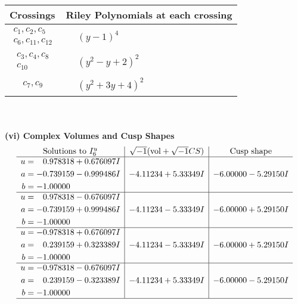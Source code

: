 \documentclass[1p]{elsarticle_modified}
\theoremstyle{definition}
\newcommand{\I}{\sqrt{-1}}
\begin{document}
\begin{tabular}{m{50pt}|m{274pt}}
Crossings & \hspace{64pt}Riley Polynomials at each crossing \\
\hline $$\begin{aligned}c_{1},c_{2},c_{5}\\c_{6},c_{11},c_{12}\end{aligned}$$&$\begin{aligned}
&(y-1)^4
\end{aligned}$\\
\hline $$\begin{aligned}c_{3},c_{4},c_{8}\\c_{10}\end{aligned}$$&$\begin{aligned}
&(y^2- y+2)^2
\end{aligned}$\\
\hline $$\begin{aligned}c_{7},c_{9}\end{aligned}$$&$\begin{aligned}
&(y^2+3 y+4)^2
\end{aligned}$\\
\hline
\end{tabular}\\~\\
\newpage\flushleft \textbf{(vi) Complex Volumes and Cusp Shapes}
$$\begin{array}{c|c|c}  
\text{Solutions to }I^u_{6}& \I (\text{vol} + \sqrt{-1}CS) & \text{Cusp shape}\\
 \hline 
\begin{aligned}
u &= \phantom{-}0.978318 + 0.676097 I \\
a &= -0.739159 - 0.999486 I \\
b &= -1.00000\phantom{ +0.000000I}\end{aligned}
 & -4.11234 + 5.33349 I & -6.00000 - 5.29150 I \\ \hline\begin{aligned}
u &= \phantom{-}0.978318 - 0.676097 I \\
a &= -0.739159 + 0.999486 I \\
b &= -1.00000\phantom{ +0.000000I}\end{aligned}
 & -4.11234 - 5.33349 I & -6.00000 + 5.29150 I \\ \hline\begin{aligned}
u &= -0.978318 + 0.676097 I \\
a &= \phantom{-}0.239159 + 0.323389 I \\
b &= -1.00000\phantom{ +0.000000I}\end{aligned}
 & -4.11234 - 5.33349 I & -6.00000 + 5.29150 I \\ \hline\begin{aligned}
u &= -0.978318 - 0.676097 I \\
a &= \phantom{-}0.239159 - 0.323389 I \\
b &= -1.00000\phantom{ +0.000000I}\end{aligned}
 & -4.11234 + 5.33349 I & -6.00000 - 5.29150 I\\
 \hline 
 \end{array}$$\newpage\newpage\renewcommand{\arraystretch}{1}
\end{document}
